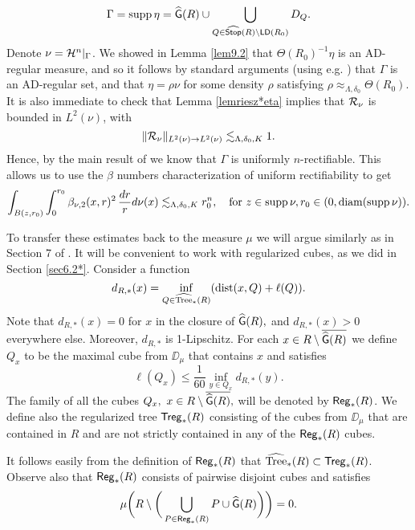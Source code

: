 \begin{equation*}
\Gamma = \operatorname{supp}\eta = {\widehat{{\mathsf G}}}(R) \cup \bigcup_{Q\in{\widehat{{\mathsf {Stop}}}}(R)\setminus{\mathsf{LD}}(R_0)} D_Q .
\end{equation*}
Denote $\nu = {\mathcal H}^n|_{\Gamma}$. We showed in Lemma \ref{lem9.2} that $\Theta(R_0)^{-1}\eta$ is an AD-regular measure, and so it follows by standard arguments (using e.g. \cite[Theorem 6.9]{Mattila-llibre}) that $\Gamma$ is an AD-regular set, and that $\eta = \rho \nu$ for some density $\rho$ satisfying $\rho\approx_{\Lambda,\delta_0}\Theta(R_0)$. It is also immediate to check that Lemma \ref{lemriesz*eta} implies that ${\mathcal R}_\nu$ is bounded in $L^2(\nu)$, with
\begin{equation*}
\|{\mathcal R}_\nu\|_{L^2(\nu)\to L^2(\nu)}\lesssim_{\Lambda,\delta_0,K}1.
\end{equation*}
Hence, by the main result of \cite{NToV1} we know that $\Gamma$ is uniformly $n$-rectifiable. This allows us to use the $\beta$ numbers characterization of uniform rectifiability \cite{DS1} to get
\begin{equation}\label{eq:betasUR}
\int_{B(z,r_0)}\int_0^{r_0}\beta_{\nu,2}(x,r)^2\, \frac{dr}{r}d\nu(x)\lesssim_{\Lambda,\delta_0,K}r_0^n,\quad \text{for }z\in\operatorname{supp}\nu, r_0\in(0,{\rm diam}(\operatorname{supp}\nu)).
\end{equation}

To transfer these estimates back to the measure $\mu$ we will argue similarly as in Section 7 of \cite{Azzam-Tolsa}. It will be convenient to work with regularized cubes, as we did in Section \ref{sec6.2*}. Consider a function
\begin{equation*}
d_{R,*}(x) = \inf_{Q\in{\widehat{{\rm Tree}}}_*(R)} ({\rm dist}(x,Q)+\ell(Q)).
\end{equation*}
Note that $d_{R,*}(x)=0$ for $x$ in the closure of  ${\widehat{{\mathsf G}}}(R),$ and $d_{R,*}(x)>0$ everywhere else. Moreover, $d_{R,*}$ is 1-Lipschitz. For each $x\in  R\setminus\overline{{\widehat{{\mathsf G}}}(R)}$ we define $Q_x$ to be the maximal cube from $\DD_\mu$ that contains $x$ and satisfies
\begin{equation*}
\ell(Q_x)\le \frac{1}{60}\inf_{y\in Q_x} d_{R,*}(y).
\end{equation*}
The family of all the cubes $Q_x,\ x\in R\setminus\overline{{\widehat{{\mathsf G}}}(R)},$ will be denoted by ${\mathsf{Reg}}_*(R)$. We define also the regularized tree ${\mathsf{Treg}}_*(R)$ consisting of the cubes from $\DD_\mu$ that are contained in $R$ and are not strictly contained in any of the ${\mathsf{Reg}}_*(R)$ cubes. 

It follows easily from the definition of ${\mathsf{Reg}}_*(R)$ that ${\widehat{{\rm Tree}}}_*(R)\subset{\mathsf{Treg}}_*(R)$.
Observe also that ${\mathsf{Reg}}_*(R)$ consists of pairwise disjoint cubes and satisfies
\begin{equation*}
\mu\bigg(R\setminus \bigg(\bigcup_{P\in{\mathsf{Reg}}_*(R)}P\cup {\widehat{{\mathsf G}}}(R)\bigg)\bigg)=0.
\end{equation*}


